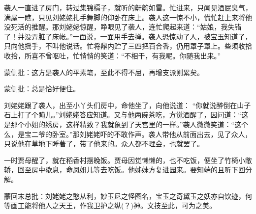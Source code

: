 \begin{parag}
    袭人一直进了房门，转过集锦槅子，就听的鼾齁如雷。忙进来，只闻见酒屁臭气，满屋一瞧，只见刘姥姥扎手舞脚的仰卧在床上。袭人这一惊不小，慌忙赶上来将他没死活的推醒。那刘姥姥惊醒，睁眼见了袭人，连忙爬起来道：“姑娘，我失错了！并没弄脏了床帐。”一面说，一面用手去掸。袭人恐惊动了人，被宝玉知道了，只向他摇手，不叫他说话。忙将鼎内贮了三四把百合香，仍用罩子罩上。些须收拾收拾，所喜不曾呕吐，忙悄悄的笑道：“不相干，有我呢。你随我出来。”\begin{note}蒙侧批：这方是袭人的平素笔，至此不得不屈，再增支派则累矣。\end{note}\begin{note}蒙侧批：总是恰好便住。\end{note}刘姥姥跟了袭人，出至小丫头们房中，命他坐了，向他说道： “你就说醉倒在山子石上打了个盹儿。”刘姥姥答应知道。又与他两碗茶吃，方觉酒醒了，因问道：“这是那个小姐的绣房，这样精致？我就象到了天宫里的一样。”袭人微微笑道：“这个么，是宝二爷的卧室。”那刘姥姥吓的不敢作声。袭人带他从前面出去，见了众人，只说他在草地下睡著了，带了他来的。众人都不理会，也就罢了。
\end{parag}


\begin{parag}
    一时贾母醒了，就在稻香村摆晚饭。贾母因觉懒懒的，也不吃饭，便坐了竹椅小敞轿，回至房中歇息，命凤姐儿等去吃饭。他姊妹方复进园来。要知端的且听下回分解。
\end{parag}


\begin{parag}
    \begin{note}蒙回末总批：刘姥姥之憨从利，妙玉尼之怪图名，宝玉之奇黛玉之妖亦自饮迹，何等画工能将他人之天王，作我卫护之纵(？)神。文技至此，可为之美。\end{note}
\end{parag}

